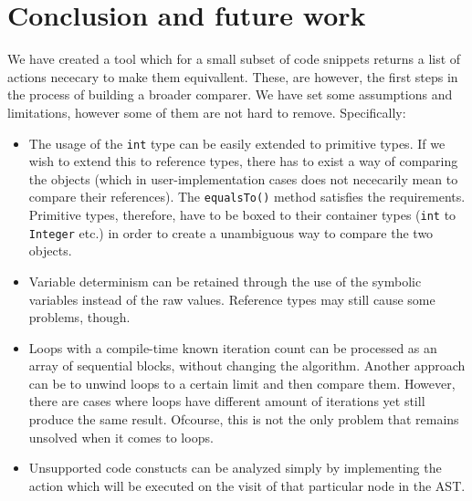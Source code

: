 \section{Conclusion and future work}
\label{sec:Conclusion}

We have created a tool which for a small subset of code snippets returns a list of actions nececary to make them equivallent. These, are however, the first steps in the process of building a broader comparer. We have set some assumptions and limitations, however some of them are not hard to remove. Specifically:
\begin{itemize}
    \item The usage of the \texttt{int} type can be easily extended to primitive types. If we wish to extend this to reference types, there has to exist a way of comparing the objects (which in user-implementation cases does not nececarily mean to compare their references). The \texttt{equalsTo()} method satisfies the requirements. Primitive types, therefore, have to be boxed to their container types (\texttt{int} to \texttt{Integer} etc.) in order to create a unambiguous way to compare the two objects.
    \item Variable determinism can be retained through the use of the symbolic variables instead of the raw values. Reference types may still cause some problems, though.
    \item Loops with a compile-time known iteration count can be processed as an array of sequential blocks, without changing the algorithm. Another approach can be to unwind loops to a certain limit and then compare them. However, there are cases where loops have different amount of iterations yet still produce the same result. Ofcourse, this is not the only problem that remains unsolved when it comes to loops.
    \item Unsupported code constucts can be analyzed simply by implementing the action which will be executed on the visit of that particular node in the AST.
\end{itemize}
